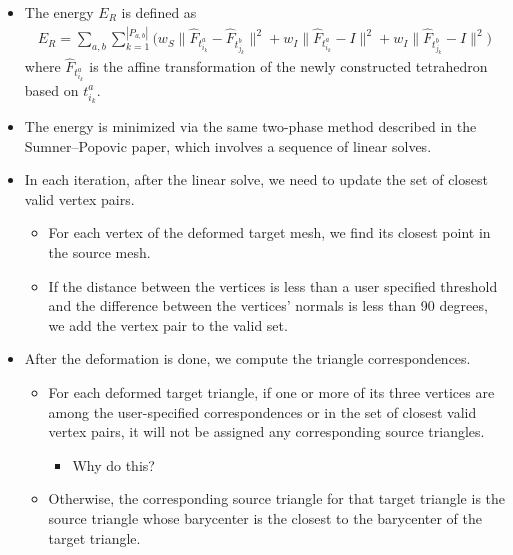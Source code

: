 \documentclass[10pt]{article}
\begin{document}
\begin{itemize}
\begin{itemize}
        \item If the triangles $t_{i_k}^a$ and $t_{j_k}^b$ are close to being coplanar, the tetrahedra will be degenerate. In this case, we simply use $t_{i_k}^a$'s and $t_{j_k}^b$'s fourth vertices.
    \end{itemize}

    \item The energy $E_R$ is defined as
    \begin{align*}
        E_R = \sum_{a,b} \sum_{k=1}^{|P_{a,b}|} \bigg( w_S \| \widehat{F}_{t_{i_k}^a} - \widehat{F}_{t_{j_k}^b} \|^2 + w_I \| \widehat{F}_{t_{i_k}^a} - I \|^2 + w_I \| \widehat{F}_{t_{j_k}^b} - I \|^2 \bigg)
    \end{align*}
    where $\widehat{F}_{t_{i_k}^a}$ is the affine transformation of the newly constructed tetrahedron based on $t_{i_k}^a$.

    \item The energy is minimized via the same two-phase method described in the Sumner--Popovic paper, which involves a sequence of linear solves.
    
    \item In each iteration, after the linear solve, we need to update the set of closest valid vertex pairs.
    \begin{itemize}
        \item For each vertex of the deformed target mesh, we find its closest point in the source mesh.
        
        \item If the distance between the vertices is less than a user specified threshold and the difference between the vertices' normals is less than 90 degrees, we add the vertex pair to the valid set.
    \end{itemize}        

    \item After the deformation is done, we compute the triangle correspondences.
    \begin{itemize}
        \item For each deformed target triangle, if one or more of its three vertices are among the user-specified correspondences or in the set of closest valid vertex pairs, it will not be assigned any corresponding source triangles.
        \begin{itemize}
            \item Why do this?
        \end{itemize}
    
        \item Otherwise, the corresponding source triangle for that target triangle is the source triangle whose barycenter is the closest to the barycenter of the target triangle.
    \end{itemize}
\end{itemize}
\end{document}
